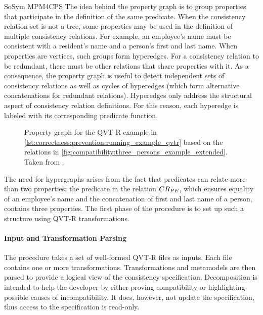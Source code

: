 \begin{copiedFrom}{SoSym MPM4CPS}
The idea behind the property graph is to group properties that participate in the definition of the same predicate. When the consistency relation set is not a tree, some properties may be used in the definition of multiple consistency relations. For example, an employee's name must be consistent with a resident's name and a person's first and last name. When properties are vertices, such groups form hyperedges. For a consistency relation to be redundant, there must be other relations that share properties with it. As a consequence, the property graph is useful to detect independent sets of consistency relations as well as cycles of hyperedges (which form alternative concatenations for redundant relations). Hyperedges only address the structural aspect of consistency relation definitions. For this reason, each hyperedge is labeled with its corresponding predicate function.

\begin{figure}
    \centering
    \resizebox{\linewidth}{!}{}
    \resizebox{\linewidth}{!}{}
    \caption{Property graph for the QVT-R example in \autoref{lst:correctness:prevention:running_example_qvtr} based on the relations in \autoref{fig:compatibility:three_persons_example_extended}. Taken from .}
    \label{fig:correctness:prevention:propertygraph_re}
\end{figure}


The need for hypergraphs arises from the fact that predicates can relate more than two properties: the predicate in the relation $CR_{PE}$, which ensures equality of an employee's name and the concatenation of first and last name of a person, contains three properties.
The first phase of the procedure is to set up such a structure using QVT-R transformations. 

\paragraph{Input and Transformation Parsing}
The procedure takes a set of well-formed QVT-R files as inputs. Each file contains one or more transformations.
Transformations and metamodels are then parsed to provide a logical view of the consistency specification. %
Decomposition is intended to help the developer by either proving compatibility or highlighting possible causes of incompatibility. 
It does, however, not update the specification, thus access to the specification is read-only.


\end{copiedFrom}

